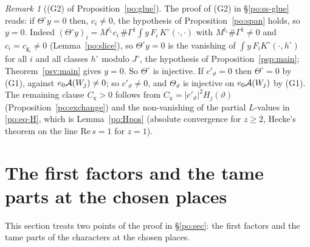 \documentclass[10pt]{amsart}
\theoremstyle{definition}
\theoremstyle{remark}
\newtheorem{remark}[theorem]{Remark}
\begin{document}
\begin{remark}[(G2) of Proposition~\ref{po:glue}]\label{psv:G2}
The proof of (G2) in \S\ref{po:ss-glue} reads: if $\Theta^\circ y=0$ then, $c_i\ne0$, the hypothesis of
Proposition~\ref{po:span} holds, so $y=0$. Indeed $(\Theta^\circ y)_i=M^{l_1}c_i\,\#\Gamma^1\int y\,F_i\,K^\circ(\cdot,\cdot)$
with $M^{l_1}\#\Gamma^1\ne0$ and $c_i=c_{\mathsf g_i}\ne0$ (Lemma~\ref{po:slice}), so $\Theta^\circ y=0$ is the vanishing of
$\int y\,F_iK^\circ(\cdot,h^\circ)$ for all $i$ and all classes $h^\circ$ modulo $J^\circ$, the hypothesis of
Proposition~\ref{psp:main}; Theorem~\ref{psv:main} gives $y=0$. So $\Theta^\circ$ is injective. If $c'_\vartheta=0$ then
$\Theta^\circ=0$ by (G1), against $e_0\poA(W_j)\ne0$; so $c'_\vartheta\ne0$, and $\Theta_\vartheta$ is injective on $e_0\poA(W_j)$
by (G1). The remaining clause $C_{\mathrm x}>0$ follows from $C_{\mathrm x}=|c'_\vartheta|^2H_j(\vartheta)$
(Proposition~\ref{po:exchange}) and the non-vanishing of the partial $L$-values in \eqref{po:eq-H}, which is
Lemma~\ref{po:Hpos} (absolute convergence for $z\ge2$, Hecke's theorem on the line $\mathrm{Re}\,s=1$ for $z=1$).
\end{remark}



\providecommand{\auO}{\mathcal O}
\providecommand{\auU}{\mathrm U}
\providecommand{\auGL}{\mathrm{GL}}
\providecommand{\auHom}{\operatorname{Hom}}
\providecommand{\auA}{\mathbb A}
\providecommand{\auF}{\mathbb F}
\providecommand{\auPl}{\Phi}
\providecommand{\auNm}{\operatorname{Nm}}
\providecommand{\auAut}{\operatorname{Aut}}
\providecommand{\aubar}[1]{\overline{#1}}
\providecommand{\pao}{\mathfrak o}
\providecommand{\plone}{\mathbf 1}
\providecommand{\plgb}[2]{\|#2\|_{#1}}
\providecommand{\poA}{\mathcal A}
\providecommand{\poT}{\mathbb T}
\providecommand{\poAA}{A_\ast}
\providecommand{\pop}{\mathsf p}
\providecommand{\plfK}{\mathsf K}
\providecommand{\pteSD}{\mathrm{SD}}
\providecommand{\pteCS}{\mathop{\textstyle\sum^{\mathrm{cl}}}}
\providecommand{\pfqC}{\mathsf C}
\providecommand{\pfqW}{W^{\mathrm{add}}}
\providecommand{\pfqm}{\mathfrak m_\vartheta}

\section{The first factors and the tame parts at the chosen places}\label{pfq:sec}

This section treats two points of the proof in \S\ref{po:sec}: the first factors and the tame parts
of the characters at the chosen places.
\end{document}
